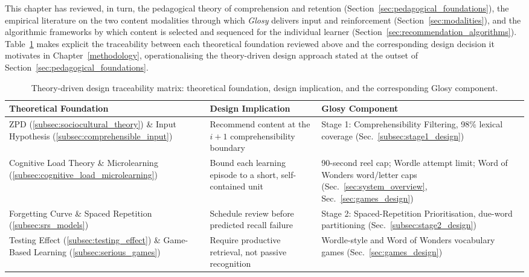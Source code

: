     This chapter has reviewed, in turn, the pedagogical theory of comprehension and retention (Section~\ref{sec:pedagogical_foundations}), the empirical literature on the two content modalities through which \textit{Glosy} delivers input and reinforcement (Section~\ref{sec:modalities}), and the algorithmic frameworks by which content is selected and sequenced for the individual learner (Section~\ref{sec:recommendation_algorithms}). Table~\ref{tab:theory_synthesis} makes explicit the traceability between each theoretical foundation reviewed above and the corresponding design decision it motivates in Chapter~\ref{methodology}, operationalising the theory-driven design approach stated at the outset of Section~\ref{sec:pedagogical_foundations}.

    \begin{table}[htbp]
        \centering
        \small
        \caption{Theory-driven design traceability matrix: theoretical foundation, design implication, and the corresponding Glosy component.}
        \label{tab:theory_synthesis}
        \begin{tabular}{p{3.6cm}p{4.6cm}p{4.6cm}}
            \hline
            \textbf{Theoretical Foundation} & \textbf{Design Implication} & \textbf{Glosy Component} \\
            \hline
            ZPD (\ref{subsec:sociocultural_theory}) \& Input Hypothesis (\ref{subsec:comprehensible_input}) &
            Recommend content at the $i+1$ comprehensibility boundary &
            Stage 1: Comprehensibility Filtering, 98\% lexical coverage (Sec.~\ref{subsec:stage1_design}) \\
            \hline
            Cognitive Load Theory \& Microlearning (\ref{subsec:cognitive_load_microlearning}) &
            Bound each learning episode to a short, self-contained unit &
            90-second reel cap; Wordle attempt limit; Word of Wonders word/letter caps (Sec.~\ref{sec:system_overview}, Sec.~\ref{sec:games_design}) \\
            \hline
            Forgetting Curve \& Spaced Repetition (\ref{subsec:srs_models}) &
            Schedule review before predicted recall failure &
            Stage 2: Spaced-Repetition Prioritisation, due-word partitioning (Sec.~\ref{subsec:stage2_design}) \\
            \hline
            Testing Effect (\ref{subsec:testing_effect}) \&
            Game-Based Learning (\ref{subsec:serious_games}) &
            Require productive retrieval, not passive recognition &
            Wordle-style and Word of Wonders vocabulary games (Sec.~\ref{sec:games_design}) \\

\end{tabular}
\end{table}
